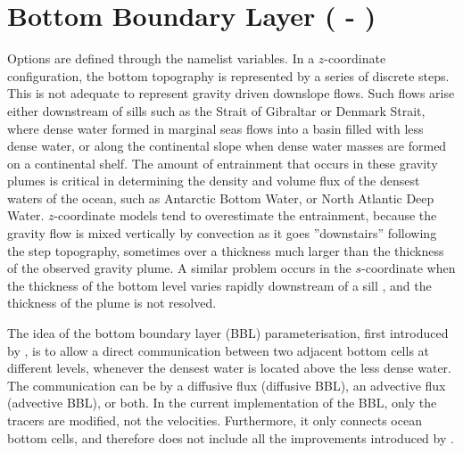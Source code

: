 \documentclass[NEMO_book]{subfiles}
\begin{document}
\section  [Bottom Boundary Layer (\mdl{trabbl} - \key{trabbl})]
		{Bottom Boundary Layer ( - )}
\label{TRA_bbl}

Options are defined through the   namelist variables.
In a $z$-coordinate configuration, the bottom topography is represented by a 
series of discrete steps. This is not adequate to represent gravity driven 
downslope flows. Such flows arise either downstream of sills such as the Strait of 
Gibraltar or Denmark Strait, where dense water formed in marginal seas flows 
into a basin filled with less dense water, or along the continental slope when dense 
water masses are formed on a continental shelf. The amount of entrainment 
that occurs in these gravity plumes is critical in determining the density 
and volume flux of the densest waters of the ocean, such as Antarctic Bottom Water, 
or North Atlantic Deep Water. $z$-coordinate models tend to overestimate the 
entrainment, because the gravity flow is mixed vertically by convection 
as it goes ''downstairs'' following the step topography, sometimes over a thickness 
much larger than the thickness of the observed gravity plume. A similar problem 
occurs in the $s$-coordinate when the thickness of the bottom level varies rapidly 
downstream of a sill \citep{Willebrand_al_PO01}, and the thickness 
of the plume is not resolved. 

The idea of the bottom boundary layer (BBL) parameterisation, first introduced by 
\citet{Beckmann_Doscher1997}, is to allow a direct communication between 
two adjacent bottom cells at different levels, whenever the densest water is 
located above the less dense water. The communication can be by a diffusive flux
(diffusive BBL), an advective flux (advective BBL), or both. In the current 
implementation of the BBL, only the tracers are modified, not the velocities. 
Furthermore, it only connects ocean bottom cells, and therefore does not include 
all the improvements introduced by \citet{Campin_Goosse_Tel99}.
\end{document}
